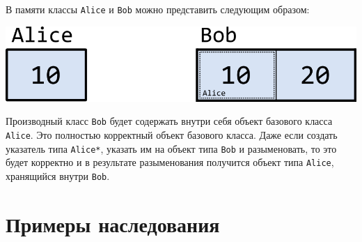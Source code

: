 \documentclass{article}
\begin{document}
В памяти классы \texttt{Alice} и \texttt{Bob} можно представить следующим образом:
\begin{center}
\includegraphics[scale=1]{../images/alice_bob_in_memory.png}
\end{center}
Производный класс \texttt{Bob} будет содержать внутри себя объект базового класса \texttt{Alice}. Это полностью корректный объект базового класса. Даже если создать указатель типа \texttt{Alice*}, указать им на объект типа \texttt{Bob} и разыменовать, то это будет корректно и в результате разыменования получится объект типа \texttt{Alice}, хранящийся внутри \texttt{Bob}.


\section*{Примеры наследования}
\end{document}
